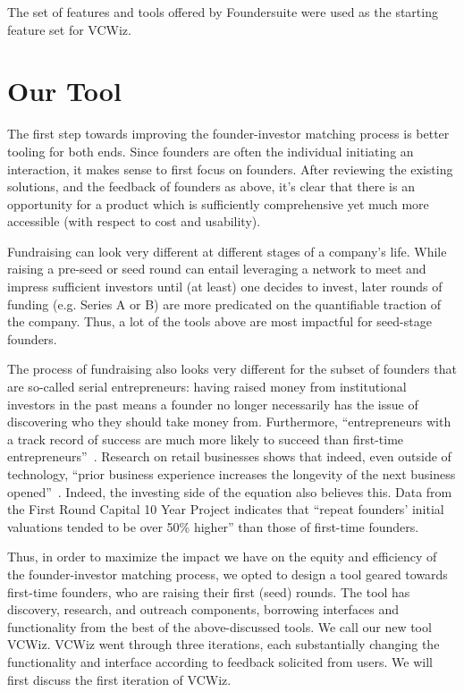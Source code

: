 The set of features and tools offered by Foundersuite were used as the starting feature set for VCWiz.

\section{Our Tool}
\label{chap3:tool}

The first step towards improving the founder-investor matching process is better tooling for both ends. Since founders are often the individual initiating an interaction, it makes sense to first focus on founders. After reviewing the existing solutions, and the feedback of founders as above, it's clear that there is an opportunity for a product which is sufficiently comprehensive yet much more accessible (with respect to cost and usability).

Fundraising can look very different at different stages of a company's life. While raising a pre-seed or seed round can entail leveraging a network to meet and impress sufficient investors until (at least) one decides to invest, later rounds of funding (e.g. Series A or B) are more predicated on the quantifiable traction of the company. Thus, a lot of the tools above are most impactful for seed-stage founders.

The process of fundraising also looks very different for the subset of founders that are so-called serial entrepreneurs: having raised money from institutional investors in the past means a founder no longer necessarily has the issue of discovering who they should take money from. Furthermore, ``entrepreneurs with a track record of success are much more likely to succeed than first-time entrepreneurs''~\cite{gompers2010performance}. Research on retail businesses shows that indeed, even outside of technology, ``prior business experience increases the longevity of the next business opened''~\cite{doi:10.1086/683820}. Indeed, the investing side of the equation also believes this. Data from the First Round Capital 10 Year Project \cite{first-round-10-years} indicates that ``repeat founders' initial valuations tended to be over 50\% higher'' than those of first-time founders.

Thus, in order to maximize the impact we have on the equity and efficiency of the founder-investor matching process, we opted to design a tool geared towards first-time founders, who are raising their first (seed) rounds. The tool has discovery, research, and outreach components, borrowing interfaces and functionality from the best of the above-discussed tools. We call our new tool VCWiz. VCWiz went through three iterations, each substantially changing the functionality and interface according to feedback solicited from users. We will first discuss the first iteration of VCWiz.

